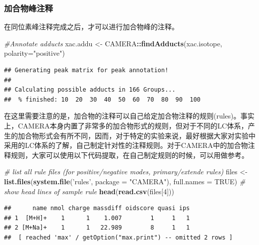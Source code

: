 \documentclass[]{ctexbook}
\newenvironment{Shaded}{\begin{snugshade}}{\end{snugshade}}
\newcommand{\CommentTok}[1]{\textcolor[rgb]{0.56,0.35,0.01}{\textit{#1}}}
\newcommand{\DataTypeTok}[1]{\textcolor[rgb]{0.13,0.29,0.53}{#1}}
\newcommand{\DecValTok}[1]{\textcolor[rgb]{0.00,0.00,0.81}{#1}}
\newcommand{\KeywordTok}[1]{\textcolor[rgb]{0.13,0.29,0.53}{\textbf{#1}}}
\newcommand{\NormalTok}[1]{#1}
\newcommand{\OperatorTok}[1]{\textcolor[rgb]{0.81,0.36,0.00}{\textbf{#1}}}
\newcommand{\OtherTok}[1]{\textcolor[rgb]{0.56,0.35,0.01}{#1}}
\newcommand{\StringTok}[1]{\textcolor[rgb]{0.31,0.60,0.02}{#1}}
\begin{document}
\subsubsection{加合物峰注释}

在同位素峰注释完成之后，才可以进行加合物峰的注释。

\begin{Shaded}
\begin{Highlighting}[]
\CommentTok{#Annotate adducts}
\NormalTok{xac.addu <-}\StringTok{ }\NormalTok{CAMERA}\OperatorTok{::}\KeywordTok{findAdducts}\NormalTok{(xac.isotope, }\DataTypeTok{polarity=}\StringTok{"positive"}\NormalTok{)}
\end{Highlighting}
\end{Shaded}

\begin{verbatim}
## Generating peak matrix for peak annotation!
## 
## Calculating possible adducts in 166 Groups... 
##  % finished: 10  20  30  40  50  60  70  80  90  100
\end{verbatim}

在这里需要注意的是，加合物的注释可以自己给定加合物注释的规则(rules)。事实上，CAMERA本身内置了非常多的加合物形式的规则，但对于不同的LC体系，产生的加合物形式会有所不同，因而，对于特定的实验来说，最好根据大家对实验中采用的LC体系的了解，自己制定针对性的注释规则。对于CAMERA中的加合物注释规则，大家可以使用以下代码提取，在自己制定规则的时候，可以用做参考。

\begin{Shaded}
\begin{Highlighting}[]
\CommentTok{# list all rule files (for positive/negative modes, primary/extende rules)}
\NormalTok{files <-}\StringTok{ }\KeywordTok{list.files}\NormalTok{(}\KeywordTok{system.file}\NormalTok{(}\StringTok{'rules'}\NormalTok{, }\DataTypeTok{package =} \StringTok{"CAMERA"}\NormalTok{), }\DataTypeTok{full.names =} \OtherTok{TRUE}\NormalTok{)}
\CommentTok{# show head lines of sample rule}
\KeywordTok{head}\NormalTok{(}\KeywordTok{read.csv}\NormalTok{(files[}\DecValTok{4}\NormalTok{]))}
\end{Highlighting}
\end{Shaded}

\begin{verbatim}
##      name nmol charge massdiff oidscore quasi ips
## 1  [M+H]+    1      1    1.007        1     1   1
## 2 [M+Na]+    1      1   22.989        8     1   1
##  [ reached 'max' / getOption("max.print") -- omitted 2 rows ]
\end{verbatim}
\end{document}
